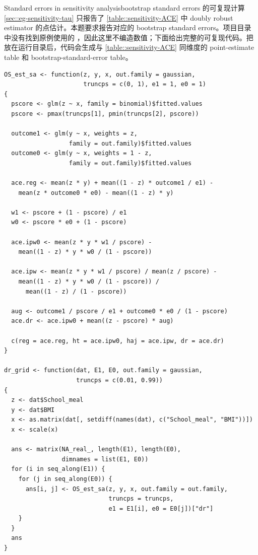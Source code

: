 \begin{exercisesolution}{Standard errors in sensitivity analysis}{bootstrap standard errors 的可复现计算}
\cref{sec::eg-sensitivity-tau} 只报告了 \cref{table::sensitivity-ACE} 中 doubly robust estimator 的点估计。本题要求报告对应的 bootstrap standard errors。项目目录中没有找到原例使用的 ，因此这里不编造数值；下面给出完整的可复现代码。把  放在运行目录后，代码会生成与 \cref{table::sensitivity-ACE} 同维度的 point-estimate table 和 bootstrap-standard-error table。

\begin{lstlisting}
OS_est_sa <- function(z, y, x, out.family = gaussian,
                      truncps = c(0, 1), e1 = 1, e0 = 1)
{
  pscore <- glm(z ~ x, family = binomial)$fitted.values
  pscore <- pmax(truncps[1], pmin(truncps[2], pscore))

  outcome1 <- glm(y ~ x, weights = z,
                  family = out.family)$fitted.values
  outcome0 <- glm(y ~ x, weights = 1 - z,
                  family = out.family)$fitted.values

  ace.reg <- mean(z * y) + mean((1 - z) * outcome1 / e1) -
    mean(z * outcome0 * e0) - mean((1 - z) * y)

  w1 <- pscore + (1 - pscore) / e1
  w0 <- pscore * e0 + (1 - pscore)

  ace.ipw0 <- mean(z * y * w1 / pscore) -
    mean((1 - z) * y * w0 / (1 - pscore))

  ace.ipw <- mean(z * y * w1 / pscore) / mean(z / pscore) -
    mean((1 - z) * y * w0 / (1 - pscore)) /
      mean((1 - z) / (1 - pscore))

  aug <- outcome1 / pscore / e1 + outcome0 * e0 / (1 - pscore)
  ace.dr <- ace.ipw0 + mean((z - pscore) * aug)

  c(reg = ace.reg, ht = ace.ipw0, haj = ace.ipw, dr = ace.dr)
}

dr_grid <- function(dat, E1, E0, out.family = gaussian,
                    truncps = c(0.01, 0.99))
{
  z <- dat$School_meal
  y <- dat$BMI
  x <- as.matrix(dat[, setdiff(names(dat), c("School_meal", "BMI"))])
  x <- scale(x)

  ans <- matrix(NA_real_, length(E1), length(E0),
                dimnames = list(E1, E0))
  for (i in seq_along(E1)) {
    for (j in seq_along(E0)) {
      ans[i, j] <- OS_est_sa(z, y, x, out.family = out.family,
                             truncps = truncps,
                             e1 = E1[i], e0 = E0[j])["dr"]
    }
  }
  ans
}


\end{lstlisting}
\end{exercisesolution}
